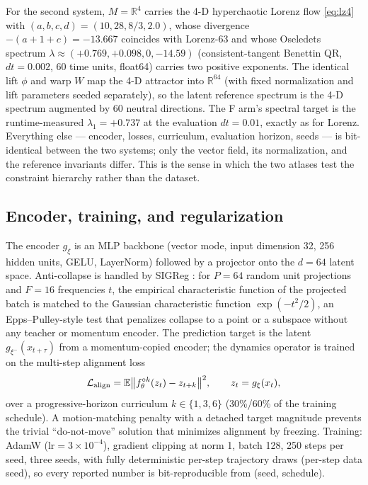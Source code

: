 \documentclass[11pt]{article}
\newcommand{\R}{\mathbb{R}}
\newcommand{\E}{\mathbb{E}}
\begin{document}
For the second system, $M=\R^4$ carries the 4-D hyperchaotic Lorenz
flow \eqref{eq:lz4} with $(a,b,c,d)=(10,28,8/3,2.0)$, whose divergence
$-(a+1+c)=-13.667$ coincides with Lorenz-63 and whose Oseledets
spectrum $\lambda\approx(+0.769,+0.098,0,-14.59)$ (consistent-tangent
Benettin QR, $dt=0.002$, 60 time units, float64) carries two positive
exponents. The identical lift $\phi$ and warp $W$ map the 4-D
attractor into $\R^{64}$ (with fixed normalization and lift parameters
seeded separately), so the latent reference spectrum is the 4-D
spectrum augmented by 60 neutral directions. The F arm's spectral
target is the runtime-measured $\lambda_1=+0.737$ at the evaluation
$dt=0.01$, exactly as for Lorenz. Everything else --- encoder,
losses, curriculum, evaluation horizon, seeds --- is bit-identical
between the two systems; only the vector field, its normalization, and
the reference invariants differ. This is the sense in which the two
atlases test the constraint hierarchy rather than the dataset.

\subsection{Encoder, training, and regularization}
\label{sec:methods-encoder}

The encoder $g_\xi$ is an MLP backbone (vector mode, input dimension 32,
256 hidden units, GELU, LayerNorm) followed by a projector onto the
$d=64$ latent space. Anti-collapse is handled by SIGReg
\cite{bardes2024sigreg}: for $P=64$ random unit projections and $F=16$
frequencies $t$, the empirical characteristic function of the projected
batch is matched to the Gaussian characteristic function
$\exp(-t^2/2)$, an Epps--Pulley-style test that penalizes collapse to a
point or a subspace without any teacher or momentum encoder. The
prediction target is the latent $g_{\xi^-}(x_{t+\tau})$ from a
momentum-copied encoder; the dynamics operator is trained on the
multi-step alignment loss
\begin{equation}
  \mathcal L_{\rm align}=\E\big\| f_\theta^{\circ k}(z_t) - z_{t+k}
  \big\|^2, \qquad z_t=g_\xi(x_t),
\end{equation}
over a progressive-horizon curriculum $k\in\{1,3,6\}$ (30\%/60\% of the
training schedule). A motion-matching penalty with a detached target
magnitude prevents the trivial ``do-not-move'' solution that minimizes
alignment by freezing. Training: AdamW ($\mathrm{lr}=3\times10^{-4}$),
gradient clipping at norm 1, batch 128, 250 steps per seed, three seeds,
with fully deterministic per-step trajectory draws (per-step data seed),
so every reported number is bit-reproducible from (seed, schedule).
\end{document}

